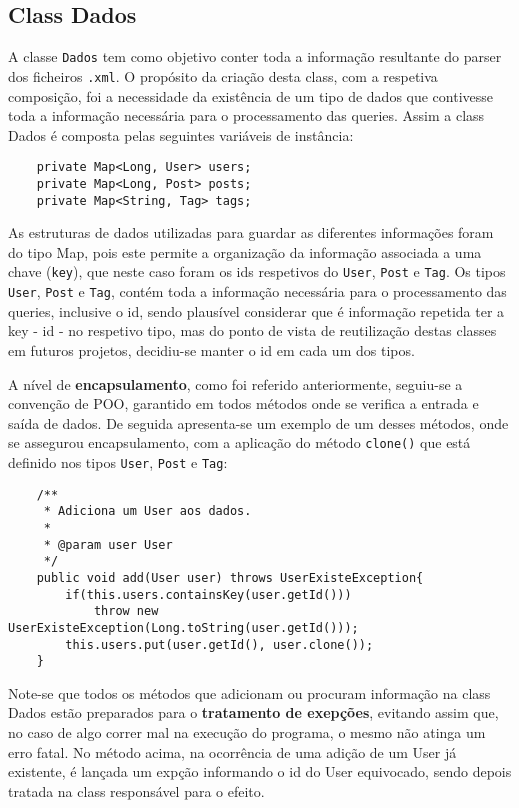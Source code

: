 \documentclass[11pt,a4paper]{article}
\begin{document}
\subsection{Class Dados}

A classe \texttt{Dados} tem como objetivo conter toda a informação resultante do parser dos ficheiros \texttt{.xml}.
O propósito da criação desta class, com a respetiva composição, foi a necessidade da existência de um tipo de dados que contivesse
toda a informação necessária para o processamento das queries. Assim a class Dados é composta pelas seguintes variáveis de instância:

\begin{verbatim}
    private Map<Long, User> users;
    private Map<Long, Post> posts;
    private Map<String, Tag> tags;
\end{verbatim}

As estruturas de dados utilizadas para guardar as diferentes informações foram do tipo Map, pois este permite a organização da informação associada a uma chave (\texttt{key}),
que neste caso foram os ids respetivos do \texttt{User}, \texttt{Post} e \texttt{Tag}. Os tipos \texttt{User}, \texttt{Post} e \texttt{Tag},
contém toda a informação necessária para o processamento das queries, inclusive o id, sendo plausível considerar que é informação repetida ter a key - id -
no respetivo tipo, mas do ponto de vista de reutilização destas classes em futuros projetos, decidiu-se manter o id em cada um dos tipos.\newline

A nível de \textbf{encapsulamento}, como foi referido anteriormente, seguiu-se a convenção de POO, garantido em todos métodos onde se verifica a entrada e saída de dados.
De seguida apresenta-se um exemplo de um desses métodos, onde se assegurou encapsulamento, com a aplicação do método \texttt{clone()} que está definido nos tipos \texttt{User}, \texttt{Post} e \texttt{Tag}:

\begin{verbatim}
    /**
     * Adiciona um User aos dados.
     *
     * @param user User
     */
    public void add(User user) throws UserExisteException{
        if(this.users.containsKey(user.getId()))
            throw new UserExisteException(Long.toString(user.getId()));
        this.users.put(user.getId(), user.clone());
    }
\end{verbatim}

Note-se que todos os métodos que adicionam ou procuram informação na class Dados estão preparados para o  \textbf{tratamento de exepções}, evitando assim que,
no caso de algo correr mal na execução do programa, o mesmo não atinga um erro fatal. No método acima, na ocorrência
de uma adição de um User já existente, é lançada um expção informando o id do User equivocado, sendo depois tratada na class responsável para o efeito. \newline
\end{document}
